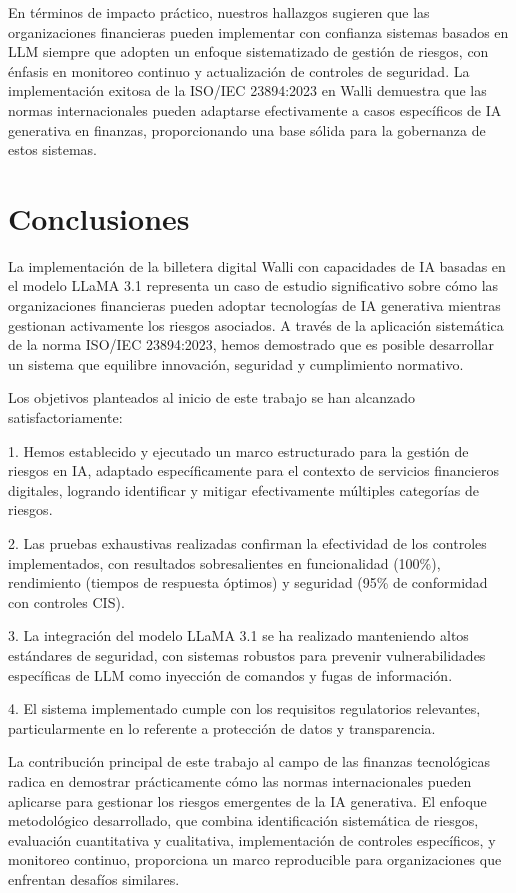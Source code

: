 \documentclass[12pt]{article}
\begin{document}
En términos de impacto práctico, nuestros hallazgos sugieren que las organizaciones financieras pueden implementar con confianza sistemas basados en LLM siempre que adopten un enfoque sistematizado de gestión de riesgos, con énfasis en monitoreo continuo y actualización de controles de seguridad. La implementación exitosa de la ISO/IEC 23894:2023 en Walli demuestra que las normas internacionales pueden adaptarse efectivamente a casos específicos de IA generativa en finanzas, proporcionando una base sólida para la gobernanza de estos sistemas.

\section{Conclusiones}
La implementación de la billetera digital Walli con capacidades de IA basadas en el modelo LLaMA 3.1 representa un caso de estudio significativo sobre cómo las organizaciones financieras pueden adoptar tecnologías de IA generativa mientras gestionan activamente los riesgos asociados. A través de la aplicación sistemática de la norma ISO/IEC 23894:2023, hemos demostrado que es posible desarrollar un sistema que equilibre innovación, seguridad y cumplimiento normativo.

Los objetivos planteados al inicio de este trabajo se han alcanzado satisfactoriamente:

1. Hemos establecido y ejecutado un marco estructurado para la gestión de riesgos en IA, adaptado específicamente para el contexto de servicios financieros digitales, logrando identificar y mitigar efectivamente múltiples categorías de riesgos.

2. Las pruebas exhaustivas realizadas confirman la efectividad de los controles implementados, con resultados sobresalientes en funcionalidad (100\%), rendimiento (tiempos de respuesta óptimos) y seguridad (95\% de conformidad con controles CIS).

3. La integración del modelo LLaMA 3.1 se ha realizado manteniendo altos estándares de seguridad, con sistemas robustos para prevenir vulnerabilidades específicas de LLM como inyección de comandos y fugas de información.

4. El sistema implementado cumple con los requisitos regulatorios relevantes, particularmente en lo referente a protección de datos y transparencia.

La contribución principal de este trabajo al campo de las finanzas tecnológicas radica en demostrar prácticamente cómo las normas internacionales pueden aplicarse para gestionar los riesgos emergentes de la IA generativa. El enfoque metodológico desarrollado, que combina identificación sistemática de riesgos, evaluación cuantitativa y cualitativa, implementación de controles específicos, y monitoreo continuo, proporciona un marco reproducible para organizaciones que enfrentan desafíos similares.
\end{document}
